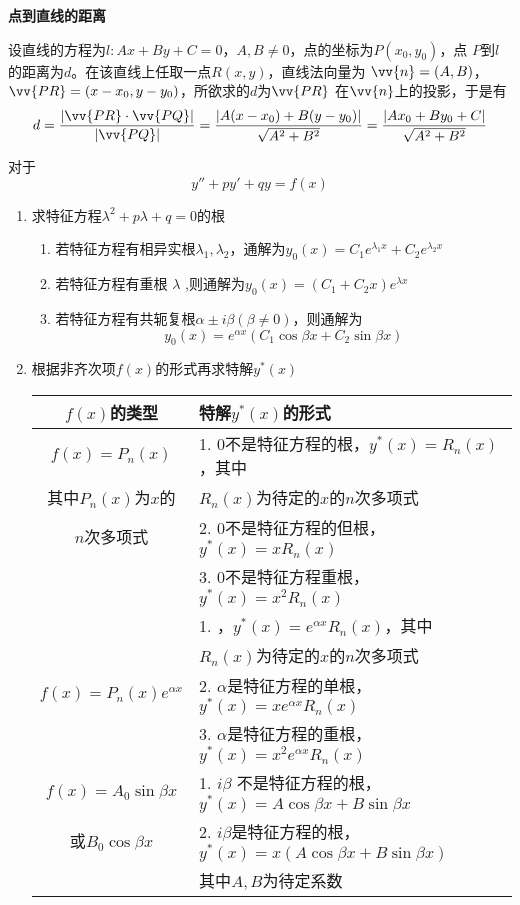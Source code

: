 \documentclass{article}
\begin{document}
\textbf{点到直线的距离}

设直线的方程为\(l:Ax+By+C=0\)，\(A,B\neq0\)，点的坐标为\(P(x_0,y_0)\)，点
\(P\)到\(l\)的距离为\(d\)。在该直线上任取一点\(R(x,y)\)，直线法向量为
\(\vv{n}=(A,B)\)，\(\vv{PR}=(x-x_0,y-y_0)\)，所欲求的\(d\)为\(\vv{PR}\)
在\(\vv{n}\)上的投影，于是有
\begin{equation*}
d=\frac{\abs{\vv{PR}\cdot\vv{PQ}}}{\abs{\vv{PQ}}}=
\frac{\abs{A(x-x_0)+B(y-y_0)}}{\sqrt{A^2+B^2}}=\frac{\abs{Ax_0+By_0+C}}{\sqrt{A^2+B^2}}
\end{equation*}

对于
\begin{equation*}
y''+py'+qy=f(x)
\end{equation*}
\begin{enumerate}
\item 求特征方程\(\lambda^2+p\lambda+q=0\)的根
\begin{enumerate}
\item 若特征方程有相异实根\(\lambda_1,\lambda_2\)，通解为\(y_0(x)=C_1e^{\lambda_1x}+C_2e^{\lambda_2x}\)
\item 若特征方程有重根 \(\lambda\) ,则通解为\(y_0(x)=(C_1+C_2x)e^{\lambda x}\)
\item 若特征方程有共轭复根\(\alpha\pm i\beta(\beta\neq0)\)，则通解为
\begin{equation*}
y_0(x)=e^{\alpha x}(C_1\cos\beta x+C_2\sin\beta x)
\end{equation*}
\end{enumerate}
\item 根据非齐次项\(f(x)\)的形式再求特解\(y^*(x)\)

\begin{tabular}{|c|l|}
\hline
\(f(x)\)的类型&特解\(y^*(x)\)的形式 \\\hline
\(f(x)=P_n(x)\)&1. 0不是特征方程的根，\(y^*(x)=R_n(x)\)，其中\\
其中\(P_n(x)\)为\(x\)的&\(R_n(x)\)为待定的\(x\)的\(n\)次多项式\\
\(n\)次多项式&2. 0不是特征方程的但根，\(y^*(x)=xR_n(x)\)\\
&3. 0不是特征方程重根，\(y^*(x)=x^2R_n(x)\)\\\hline
&1. ，\(y^*(x)=e^{\alpha x}R_n(x)\)，其中\\
&\(R_n(x)\)为待定的\(x\)的\(n\)次多项式\\
\(f(x)=P_n(x)e^{\alpha x}\)&2. \(\alpha\)是特征方程的单根，\(y^*(x)=xe^{\alpha x}R_n(x)\)\\
&3. \(\alpha\)是特征方程的重根，\(y^*(x)=x^2e^{\alpha x}R_n(x)\)\\\hline
\(f(x)=A_0\sin\beta x\)&1. \(i\beta\) 不是特征方程的根，\(y^*(x)=A\cos\beta x+B\sin\beta x\)\\
或\(B_0\cos\beta x\)&2. \(i\beta\)是特征方程的根，\(y^*(x)=x(A\cos\beta x+B\sin\beta x)\)\\
&其中\(A,B\)为待定系数\\\hline
\end{tabular}
\end{enumerate}
\end{document}
